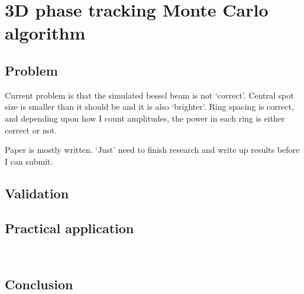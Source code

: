 \chapter{3D phase tracking Monte Carlo algorithm}

\section{Problem}

Current problem is that the simulated bessel beam is not `correct'. Central spot size is smaller than it should be and it is also `brighter'.
Ring spacing is correct, and depending upon how I count amplitudes, the power in each ring is either correct or not.

Paper is mostly written. `Just' need to finish research and write up results before I can submit.

\section{Validation}
\section{Practical application}
~\cite{mignon2016fractional}
\section{Conclusion}